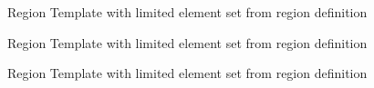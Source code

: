 \begin{figure}[h!]
  \centering
  \caption{Region Template with limited element set from region definition}
\end{figure}

\begin{figure}[h!]
  \centering
  \caption{Region Template with limited element set from region definition}
\end{figure}


\begin{figure}[h!]
  \centering
  \caption{Region Template with limited element set from region definition}
\end{figure}


